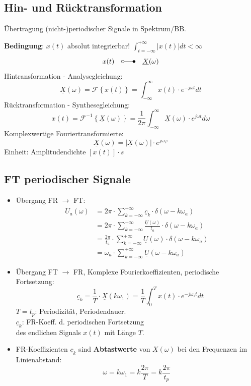 \subsection{Hin- und Rücktransformation}
{\small Übertragung (nicht-)periodischer Signale in Spektrum/BB.}\\
\begin{mdframed}[style=exercise]
	\small { \textbf{Bedingung}: $x(t)$ absolut integrierbar! $\int_{t=-\infty}^{+\infty}|x(t)|dt<\infty$ }
	\[
		x(t) \quad \laplace  \quad \underline{X}(\omega)
	\]
	Hintransformation - Analysegleichung:
	\[
		\underline{X}(\omega)=\mathcal{F}\left\{ x(t) \right\} = \int_{-\infty}^{\infty} x(t) \cdot e^{-j\omega t} dt
	\]
	Rücktransformation - Synthesegleichung:
	\[
		x(t) = \mathcal{F}^{-1}\left\{ \underline{X}(\omega) \right\} = \frac{1}{2\pi}\int_{-\infty}^{\infty} \underline{X}(\omega) \cdot e^{j\omega t} d\omega
	\]
	Komplexwertige Fouriertransformierte:
	\[
	\underline{X}(\omega) = |\underline{X}(\omega)|\cdot e^{j\omega\varphi}
	\]
	\footnotesize
	Einheit: Amplitudendichte $\left[ x(t) \right]\cdot s$
	\normalsize
	
\end{mdframed}

\subsection{FT periodischer Signale}
\begin{itemize}

	\item Übergang FR $\rightarrow$ FT:
\begin{align*}
	U_a(\omega) &= 2\pi \cdot \sum_{k=-\infty}^{+\infty} \underline{c}_k \cdot \delta(\omega-k\omega_a)\\
	& = 2\pi \cdot \sum_{k=-\infty}^{+\infty} \frac{\underline{U}(\omega)}{t_a} \cdot \delta(\omega-k\omega_a)\\
	&= \frac{2\pi}{t_a} \cdot \sum_{k=-\infty}^{+\infty} \underline{U}(\omega) \cdot \delta(\omega-k\omega_a) \\
	& =  \omega_a \cdot \sum_{k=-\infty}^{+\infty} \underline{U}(\omega-k\omega_a)
\end{align*}
	\item Übergang FT $\rightarrow$ FR, Komplexe Fourierkoeffizienten, periodische Fortsetzung:
	\[ \boxed{
		\quad \underline{c}_k =
		\frac{1}{T} \cdot \underline{X}(k\omega_1) } =
		\frac{1}{T}\int_0^T x(t) \cdot e^{-j\omega_1 t} dt
	\]
	\small{$T=t_p$: Periodizität, Periodendauer.}\\
	\small{ $\underline{c}_k$: FR-Koeff. d. periodischen Fortsetzung \\des endlichen Signals $x(t)$ mit Länge $T$.}\\
	
	\item FR-Koeffizienten $\underline{c}_k $ sind
	\textbf{Abtastwerte} von $\underline{X}(\omega)$ bei den Frequenzen im Linienabstand:
	\[\omega=k\omega_1=k\frac{2\pi}{T}=k\frac{2\pi}{t_p}\]
\end{itemize}


